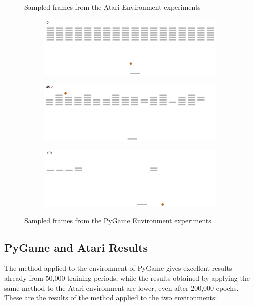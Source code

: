 \begin{figure}[h]
\begin{subfigure}[h]{0.3\linewidth}
\end{subfigure}
\caption{Sampled frames from the Atari Environment experiments}
\label{fig:atari-sequence}
\end{figure}

\begin{figure}
\centering
\begin{subfigure}[h]{0.8\linewidth}
\includegraphics[width=\linewidth]{images/pygame-sequence-0.png}
\centering
\end{subfigure}
\hfill
\begin{subfigure}[h]{0.8\linewidth}
\includegraphics[width=\linewidth]{images/pygame-sequence-1.png}
\centering
\end{subfigure}
\hfill
\begin{subfigure}[h]{0.8\linewidth}
\includegraphics[width=\linewidth]{images/pygame-sequence-2.png}
\centering
\end{subfigure}
\caption{Sampled frames from the PyGame Environment experiments}
\end{figure}

\subsection{PyGame and Atari Results}
\label{subsec:pg-a-results}
The method applied to the environment of PyGame gives excellent results already from 50,000 training periods, while the results obtained by applying the same method to the Atari environment are lower, even after 200,000 epochs. These are the results of the method applied to the two environments:

